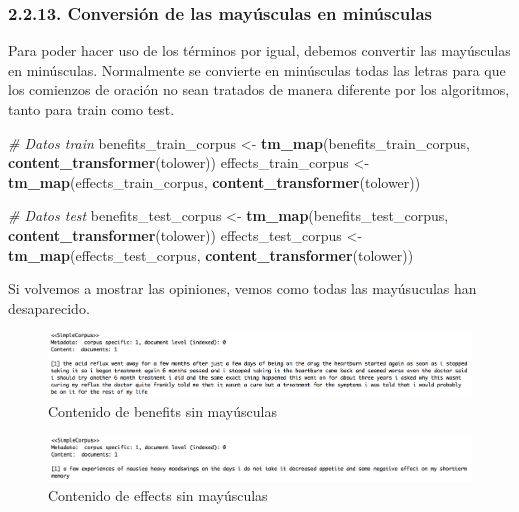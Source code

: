 \documentclass[spanish,]{article}
\newenvironment{Shaded}{\begin{snugshade}}{\end{snugshade}}
\newcommand{\KeywordTok}[1]{\textcolor[rgb]{0.13,0.29,0.53}{\textbf{#1}}}
\newcommand{\StringTok}[1]{\textcolor[rgb]{0.31,0.60,0.02}{#1}}
\newcommand{\CommentTok}[1]{\textcolor[rgb]{0.56,0.35,0.01}{\textit{#1}}}
\newcommand{\NormalTok}[1]{#1}
\begin{document}
\subsubsection{2.2.13. Conversión de las mayúsculas en
minúsculas}\label{conversion-de-las-mayusculas-en-minusculas}

Para poder hacer uso de los términos por igual, debemos convertir las
mayúsculas en minúsculas. Normalmente se convierte en minúsculas todas
las letras para que los comienzos de oración no sean tratados de manera
diferente por los algoritmos, tanto para train como test.

\begin{Shaded}
\begin{Highlighting}[]
\CommentTok{# Datos train}
\NormalTok{benefits_train_corpus <-}\StringTok{ }\KeywordTok{tm_map}\NormalTok{(benefits_train_corpus, }\KeywordTok{content_transformer}\NormalTok{(tolower))}
\NormalTok{effects_train_corpus <-}\StringTok{ }\KeywordTok{tm_map}\NormalTok{(effects_train_corpus, }\KeywordTok{content_transformer}\NormalTok{(tolower))}

\CommentTok{# Datos test}
\NormalTok{benefits_test_corpus <-}\StringTok{ }\KeywordTok{tm_map}\NormalTok{(benefits_test_corpus, }\KeywordTok{content_transformer}\NormalTok{(tolower))}
\NormalTok{effects_test_corpus <-}\StringTok{ }\KeywordTok{tm_map}\NormalTok{(effects_test_corpus, }\KeywordTok{content_transformer}\NormalTok{(tolower))}
\end{Highlighting}
\end{Shaded}

Si volvemos a mostrar las opiniones, vemos como todas las mayúsuculas
han desaparecido.

\begin{figure}[h]
    \centering
    \includegraphics[width=1\textwidth]{imagenes/benefits_mayusculas.png}
    \caption{Contenido de benefits sin mayúsculas}
    \label{benefits2}
\end{figure}

\begin{figure}[h]
    \centering
    \includegraphics[width=1\textwidth]{imagenes/effects_mayusculas.png}
    \caption{Contenido de effects sin mayúsculas}
    \label{benefits2}
\end{figure}
\end{document}
